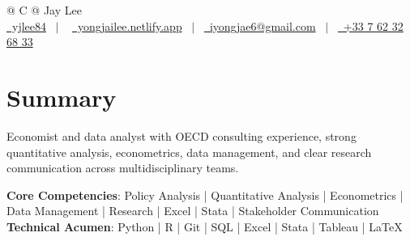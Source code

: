 \documentclass[a4paper,12pt]{article}
\begin{document}
\pagestyle{empty} 



\begin{tabularx}{\linewidth}{@{} C @{}}
\Huge{Jay Lee} \\[7.5pt]
\href{https://github.com/yjlee84}{\raisebox{-0.05\height}\faGithub\ yjlee84} \ $|$ \ 
\href{https://yongjailee.netlify.app}{\raisebox{-0.05\height}\faGlobe \ yongjailee.netlify.app} \ $|$ \ 
\href{mailto:email@mysite.com}{\raisebox{-0.05\height}\faEnvelope \ iyongjae6@gmail.com} \ $|$ \ 
\href{tel:+000000000000}{\raisebox{-0.05\height}\faMobile \ +33 7 62 32 68 33} \\
\end{tabularx}


\section{Summary}
Economist and data analyst with OECD consulting experience, strong quantitative analysis, econometrics, data management, and clear research communication across multidisciplinary teams.

\textbf{Core Competencies}: Policy Analysis | Quantitative Analysis | Econometrics | Data Management | Research | Excel | Stata | Stakeholder Communication\\
\textbf{Technical Acumen}: Python | R | Git | SQL | Excel | Stata | Tableau | \LaTeX{}
\end{document}
